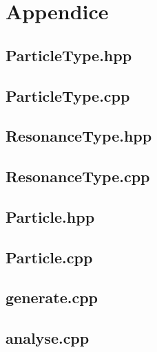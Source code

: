 \documentclass{article}
\begin{document}
\newpage

\section*{Appendice}

\subsection*{ParticleType.hpp}


\subsection*{ParticleType.cpp}


\subsection*{ResonanceType.hpp}


\subsection*{ResonanceType.cpp}


\subsection*{Particle.hpp}


\subsection*{Particle.cpp}


\subsection*{generate.cpp}


\subsection*{analyse.cpp}

\end{document}
